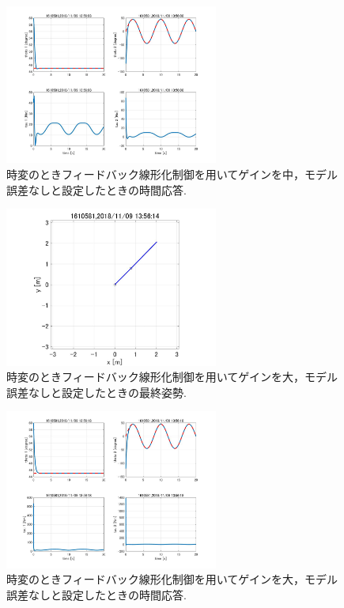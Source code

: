\documentclass[twocolumn, 10pt,a4j]{jsarticle}
\begin{document}
    \begin{figure}[H]
      \begin{center}
        \includegraphics[width=7cm]{../img/img/kansetu_FB_zihen_chu_no_model_gosa_zikan_auto.jpg}
        \caption{時変のときフィードバック線形化制御を用いてゲインを中，モデル誤差なしと設定したときの時間応答.}
      \end{center}
    \end{figure}
    \begin{figure}[H]
      \begin{center}
        \includegraphics[width=7cm]{../img/img/kansetu_FB_zihen_large_no_model_gosa_saisyu_sisei.jpg}
        \caption{時変のときフィードバック線形化制御を用いてゲインを大，モデル誤差なしと設定したときの最終姿勢.}
      \end{center}
    \end{figure}

    \begin{figure}[H]
      \begin{center}
        \includegraphics[width=7cm]{../img/img/kansetu_FB_zihen_large_no_model_gosa_zikan_auto.jpg}
        \caption{時変のときフィードバック線形化制御を用いてゲインを大，モデル誤差なしと設定したときの時間応答.}
      \end{center}
    \end{figure}
\end{document}
